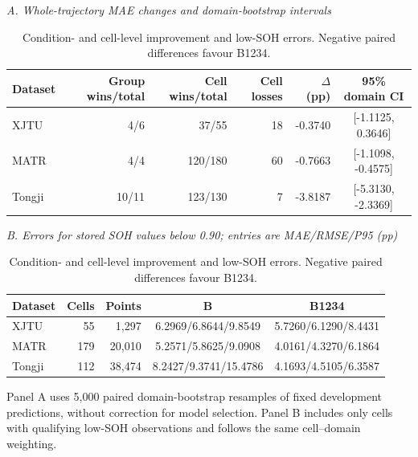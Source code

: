 \begin{table}[!htbp]\renewcommand{\arraystretch}{1.15}\centering
\caption{Condition- and cell-level improvement and low-SOH errors. Negative paired differences favour B1234.}\label{tab:cellmain}
\papertablesize\setlength{\tabcolsep}{3pt}
\textit{A. Whole-trajectory MAE changes and domain-bootstrap intervals}\\[4pt]
\begin{tabular}{lrrrrc}
\toprule
Dataset & Group wins/total & Cell wins/total & Cell losses & $\Delta$ (pp) & 95\% domain CI \\
\midrule
XJTU & 4/6 & 37/55 & 18 & -0.3740 & [-1.1125, 0.3646] \\
MATR & 4/4 & 120/180 & 60 & -0.7663 & [-1.1098, -0.4575] \\
Tongji & 10/11 & 123/130 & 7 & -3.8187 & [-5.3130, -2.3369] \\
\bottomrule
\end{tabular}
\par\medskip
\textit{B. Errors for stored SOH values below 0.90; entries are MAE/RMSE/P95 (pp)}\\[4pt]
\begin{tabular}{lrrcc}
\toprule
Dataset & Cells & Points & B & B1234 \\
\midrule
XJTU & 55 & 1,297 & 6.2969/6.8644/9.8549 & 5.7260/6.1290/8.4431 \\
MATR & 179 & 20,010 & 5.2571/5.8625/9.0908 & 4.0161/4.3270/6.1864 \\
Tongji & 112 & 38,474 & 8.2427/9.3741/15.4786 & 4.1693/4.5105/6.3587 \\
\bottomrule
\end{tabular}
\par\smallskip\begin{minipage}{\columnwidth}\papertablesize Panel A uses 5,000 paired domain-bootstrap resamples of fixed development predictions, without correction for model selection. Panel B includes only cells with qualifying low-SOH observations and follows the same cell--domain weighting.\end{minipage}
\end{table}

